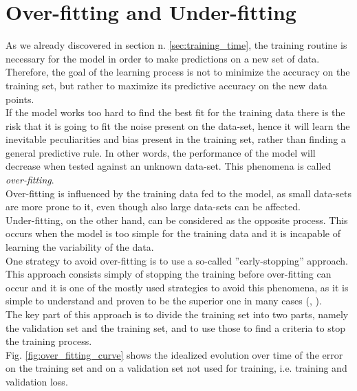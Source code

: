 



\section{Over-fitting and Under-fitting }\label{sec:of_uf}
As we already discovered in section n. \ref{sec:training_time}, the training routine is necessary for the model in order to make predictions on a new set of data. Therefore, the goal of the learning process is not to minimize the accuracy on the training set, but rather to maximize its predictive accuracy on the new data points. \citep{dietterich1995overfitting}\\
If the model works too hard to find the best fit for the training data there is the risk that it is going to fit the noise present on the data-set, hence it will learn the inevitable peculiarities and bias present in the training set, rather than finding a general predictive rule. In other words, the performance of the model will decrease when tested against an unknown data-set.\cite{jabbar2015methods} This phenomena is called \textit{over-fitting}. \citep{dietterich1995overfitting}\\
Over-fitting is influenced by the training data fed to the model, as small data-sets are more prone to it, even though also large data-sets can be affected. \cite{10.1016/j.inffus.2008.11.003}\\
Under-fitting, on the other hand, can be considered as the opposite process. This occurs when the model is too simple for the training data and it is incapable of learning the variability of the data. \cite{10.1016/j.inffus.2008.11.003}\\

One strategy to avoid over-fitting is to use a so-called ''early-stopping'' approach. This approach consists simply of stopping the training before over-fitting can occur and it is one of the mostly used strategies to avoid this phenomena, as it is simple to understand and proven to be the superior one in many cases (\citep{FINNOFF1993771}, \cite{early_stopping}). \\
The key part of this approach is to divide the training set into two parts, namely the validation set and the training set, and to use those to find a criteria to stop the training process. \\
Fig. \ref{fig:over_fitting_curve} shows the idealized evolution over time of the error on the training set and on a validation set not used for training, i.e. training and validation loss.\cite{early_stopping}

